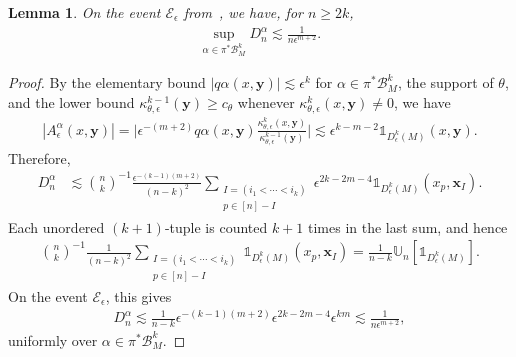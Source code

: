 \documentclass[11pt,reqno]{amsproc}
\numberwithin{equation}{section}
\newcommand{\U}{\mathbb{U}}
\newcommand{\one}{\mathbb{1}}
\newcommand{\bx}{\mathbf{x}}
\newcommand{\by}{\mathbf{y}}
\newcommand{\cE}{\mathcal{E}}
\newcommand{\cB}{\mathcal{B}}
\newcommand{\ls}{\lesssim}
\newtheorem{lemma}[counter]{Lemma}
\theoremstyle{definition}
\theoremstyle{plain}
\begin{document}
\begin{lemma} \label{lem:codiff_diagonal_exp_bound}
    On the event $\cE_\epsilon$ from~, we have, for $n\geq 2k$,
    \begin{align}
        \sup_{\alpha \in \pi^*\cB_M^k} D_n^\alpha \ls \frac{1}{n\epsilon^{m+2}}.
    \end{align}
\end{lemma}
\begin{proof}
    By the elementary bound $|q\alpha(x,\by)|\ls \epsilon^k$ for $\alpha\in\pi^*\cB_M^k$, the support of $\theta$, and the lower bound $\kappa_{\theta,\epsilon}^{k-1}(\by)\geq c_\theta$ whenever $\kappa_{\theta,\epsilon}^k(x,\by)\neq 0$, we have
    \begin{align}
        |A^\alpha_\epsilon(x,\by)| = \big\lvert \epsilon^{-(m+2)} q\alpha(x,\by) \frac{\kappa_{\theta, \epsilon}^k(x,\by)}{\kappa_{\theta,\epsilon}^{k-1}(\by)} \big\rvert \ls \epsilon^{k-m-2}\one_{D^k_\epsilon(M)}(x,\by).
    \end{align}
    Therefore,
    \begin{align}
        D_n^\alpha
        &\ls \binom{n}{k}^{-1}\frac{\epsilon^{-(k-1)(m+2)}}{(n-k)^2}
        \sum_{\substack{I=(i_1<\cdots<i_k)\\ p\in[n]-I}}
        \epsilon^{2k-2m-4}\one_{D^k_\epsilon(M)}(x_p,\bx_I).
    \end{align}
    Each unordered $(k+1)$-tuple is counted $k+1$ times in the last sum, and hence
    \begin{align}
        \binom{n}{k}^{-1}\frac{1}{(n-k)^2}
        \sum_{\substack{I=(i_1<\cdots<i_k)\\ p\in[n]-I}}
        \one_{D^k_\epsilon(M)}(x_p,\bx_I)
        =\frac{1}{n-k}\U_n[\one_{D^k_\epsilon(M)}].
    \end{align}
    On the event $\cE_\epsilon$, this gives
    \begin{align}
        D_n^\alpha\ls \frac{1}{n-k}\epsilon^{-(k-1)(m+2)}\epsilon^{2k-2m-4}\epsilon^{km}
        \ls \frac{1}{n\epsilon^{m+2}},
    \end{align}
    uniformly over $\alpha\in\pi^*\cB_M^k$.
\end{proof}
\end{document}
